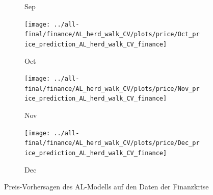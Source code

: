 \documentclass[ngerman]{ttlab-qualify}
\begin{document}
\begin{figure}[H]
\begin{subfigure}{.3\linewidth}
  \caption{Sep}
  \end{subfigure}\par\medskip
  \begin{subfigure}{.3\linewidth}
  \texttt{[image: ../all-final/finance/AL\_herd\_walk\_CV/plots/price/Oct\_price\_prediction\_AL\_herd\_walk\_CV\_finance]}\hfill
  \caption{Oct}
  \end{subfigure}
  \begin{subfigure}{.3\linewidth}
  \texttt{[image: ../all-final/finance/AL\_herd\_walk\_CV/plots/price/Nov\_price\_prediction\_AL\_herd\_walk\_CV\_finance]}\hfill
  \caption{Nov}
  \end{subfigure}
  \begin{subfigure}{.3\linewidth}
  \texttt{[image: ../all-final/finance/AL\_herd\_walk\_CV/plots/price/Dec\_price\_prediction\_AL\_herd\_walk\_CV\_finance]}\hfill
  \caption{Dec}
  \end{subfigure}
  \caption{Preis-Vorhersagen des AL-Modells auf den Daten der Finanzkrise}
\end{figure}

\newpage
\end{document}
